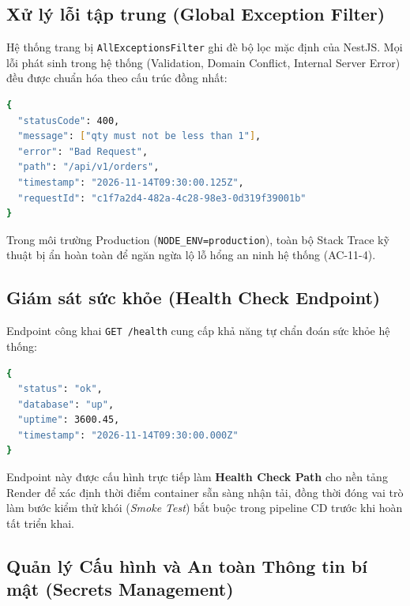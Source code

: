 \documentclass[11pt, a4paper]{article}
\begin{document}
\subsection{Xử lý lỗi tập trung (Global Exception Filter)}

Hệ thống trang bị \texttt{AllExceptionsFilter} ghi đè bộ lọc mặc định của NestJS. Mọi lỗi phát sinh trong hệ thống (Validation, Domain Conflict, Internal Server Error) đều được chuẩn hóa theo cấu trúc đồng nhất:
\begin{lstlisting}[language=bash]
{
  "statusCode": 400,
  "message": ["qty must not be less than 1"],
  "error": "Bad Request",
  "path": "/api/v1/orders",
  "timestamp": "2026-11-14T09:30:00.125Z",
  "requestId": "c1f7a2d4-482a-4c28-98e3-0d319f39001b"
}
\end{lstlisting}
Trong môi trường Production (\texttt{NODE\_ENV=production}), toàn bộ Stack Trace kỹ thuật bị ẩn hoàn toàn để ngăn ngừa lộ lỗ hổng an ninh hệ thống (AC-11-4).

\subsection{Giám sát sức khỏe (Health Check Endpoint)}

Endpoint công khai \texttt{GET /health} cung cấp khả năng tự chẩn đoán sức khỏe hệ thống:
\begin{lstlisting}[language=bash]
{
  "status": "ok",
  "database": "up",
  "uptime": 3600.45,
  "timestamp": "2026-11-14T09:30:00.000Z"
}
\end{lstlisting}
Endpoint này được cấu hình trực tiếp làm \textbf{Health Check Path} cho nền tảng Render để xác định thời điểm container sẵn sàng nhận tải, đồng thời đóng vai trò làm bước kiểm thử khói (\textit{Smoke Test}) bắt buộc trong pipeline CD trước khi hoàn tất triển khai.

\subsection{Quản lý Cấu hình và An toàn Thông tin bí mật (Secrets Management)}
\end{document}
